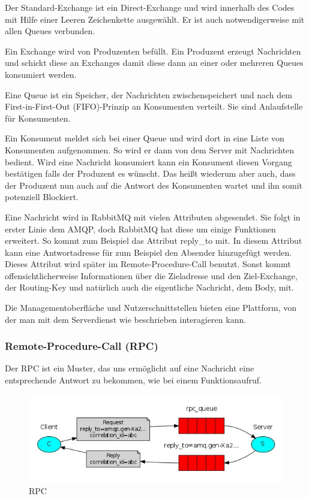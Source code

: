 \documentclass[12pt,a4paper]{scrartcl}
\begin{document}
Der Standard-Exchange ist ein Direct-Exchange und wird innerhalb des Codes mit Hilfe einer Leeren Zeichenkette ausgewählt. Er ist auch notwendigerweise mit allen Queues verbunden.

Ein Exchange wird von Produzenten befüllt. Ein Produzent erzeugt Nachrichten und schickt diese an Exchanges damit diese dann an einer oder mehreren Queues konsumiert werden.

Eine Queue ist ein Speicher, der Nachrichten zwischenspeichert und nach dem First-in-First-Out (FIFO)-Prinzip an Konsumenten verteilt. Sie sind Anlaufstelle für Konsumenten. 

Ein Konsument meldet sich bei einer Queue und wird dort in eine Liste von Konsumenten aufgenommen. So wird er dann von dem Server mit Nachrichten bedient. Wird eine Nachricht konsumiert kann ein Konsument diesen Vorgang bestätigen falls der Produzent es wünscht. Das heißt wiederum aber auch, dass der Produzent nun auch auf die Antwort des Konsumenten wartet und ihn somit potenziell Blockiert.

Eine Nachricht wird in RabbitMQ mit vielen Attributen abgesendet. Sie folgt in erster Linie dem AMQP, doch RabbitMQ hat diese um einige Funktionen erweitert. So kommt zum Beispiel das Attribut reply\_to mit. In diesem Attribut kann eine Antwortadresse für zum Beispiel den Absender hinzugefügt werden. Dieses Attribut wird später im Remote-Procedure-Call benutzt. Sonst kommt offensichtlicherweise Informationen über die Zieladresse und den Ziel-Exchange, der Routing-Key und natürlich auch die eigentliche Nachricht, dem Body, mit.

Die Managementoberfläche und Nutzerschnittstellen bieten eine Plattform, von der man mit dem Serverdienst wie beschrieben interagieren kann.

\subsubsection{Remote-Procedure-Call (RPC)}
Der RPC ist ein Muster, das uns ermöglicht auf eine Nachricht eine entsprechende Antwort zu bekommen, wie bei einem Funktionsaufruf. 

\begin{figure}[h!]
	\centering
	\includegraphics[scale=0.74]{RPC.jpg}
	\caption[https://www.rabbitmq.com/tutorials/tutorial-six-dotnet.html]{RPC}
\end{figure}
\end{document}
